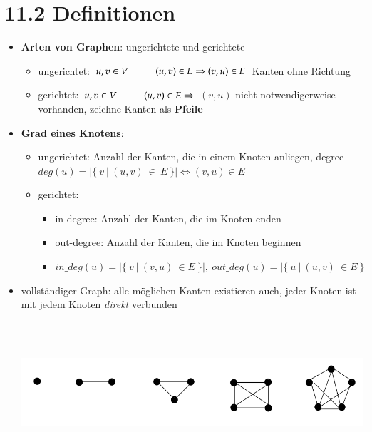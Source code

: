 \documentclass[11pt, fleqn]{scrreprt}
\begin{document}
\section*{11.2 Definitionen}
\begin{itemize}
	\item \textbf{Arten von Graphen}: ungerichtete und gerichtete
	\begin{itemize}
		\item ungerichtet: $u, v \in V \hspace*{1cm} (u,v) \in E \Rightarrow (v, u) \in E$ Kanten ohne Richtung
		\item gerichtet: $u, v \in V \hspace*{1cm} (u,v) \in E \Rightarrow$ $(v, u)$ nicht notwendigerweise vorhanden, zeichne Kanten als \textbf{Pfeile}
		\end{itemize}
		\item \textbf{Grad eines Knotens}:
		\begin{itemize}
		\item ungerichtet: Anzahl der Kanten, die in einem Knoten anliegen, \glqq degree\grqq \\
		$deg(u) = | \{ \ v\  | \ (u,v)\  \in \ E\ \}| \Leftrightarrow (v,u) \in E$
		\item gerichtet: 
		\begin{itemize}
			\item in-degree: Anzahl der Kanten, die im Knoten enden
			\item out-degree: Anzahl der Kanten, die im Knoten beginnen
			\item $in\_deg(u) = |\{ \  v \ |\  (v,u) \ \in E\ \}|, \ out\_deg(u) = |\{\  u\  |\  (u,v) \ \in E\ \}|$
		\end{itemize}
		\end{itemize}
			\item vollständiger Graph: alle möglichen Kanten existieren auch, jeder Knoten ist mit jedem Knoten \emph{direkt} verbunden\\
			\includegraphics[width=15cm,height=6cm,keepaspectratio]{./Pictures/vollstGraphen.png}\\

\end{itemize}
\end{document}
